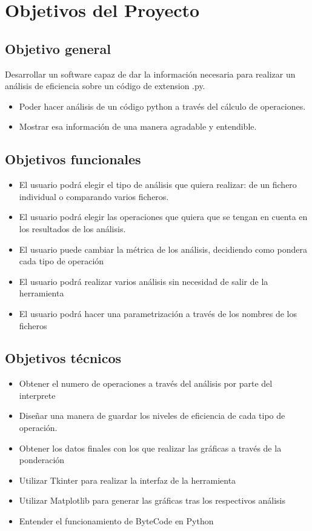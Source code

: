 
\section{Objetivos del Proyecto}

\subsection{Objetivo general}


Desarrollar un software capaz de dar la información necesaria para realizar un análisis de eficiencia sobre un código de extension .py.
\begin{itemize}
	\item Poder hacer análisis de un código python a través del cálculo de operaciones.
	\item Mostrar esa información de una manera agradable y entendible.
\end{itemize}


\subsection{Objetivos funcionales}
	\begin{itemize}
	\item El usuario podrá elegir el tipo de análisis que quiera realizar: de un fichero individual o comparando varios ficheros.
	\item El usuario podrá elegir las operaciones que quiera que se tengan en cuenta en los resultados de los análisis.
	\item El usuario puede cambiar la métrica de los análisis, decidiendo como pondera cada tipo de operación
	\item El usuario podrá realizar varios análisis sin necesidad de salir de la herramienta
	\item El usuario podrá hacer una parametrización a través de los  nombres de los ficheros
\end{itemize}


\subsection{Objetivos técnicos}
	\begin{itemize}
	\item Obtener el numero de operaciones a través del análisis por parte del interprete
	\item Diseñar una manera de guardar los niveles de eficiencia de cada tipo de operación.
	\item Obtener los datos finales con los que realizar las gráficas a través de la ponderación
	\item Utilizar Tkinter para realizar la interfaz de la herramienta
	\item Utilizar Matplotlib  para generar las gráficas tras los respectivos análisis
	\item Entender el funcionamiento de ByteCode en Python
\end{itemize}
